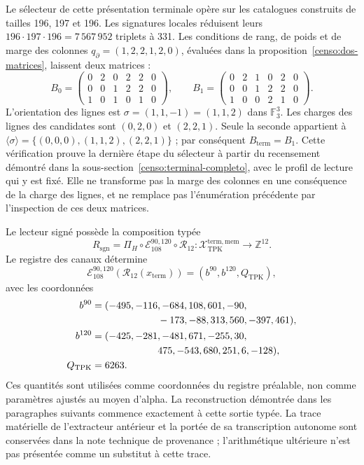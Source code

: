 Le sélecteur de cette présentation terminale opère sur les catalogues construits
de tailles 196, 197 et 196. Les signatures locales réduisent leurs
\(196\cdot197\cdot196=7\,567\,952\) triplets à 331. Les conditions de rang,
de poids et de marge des colonnes \(q_{\partial}=(1,2,2,1,2,0)\),
évaluées dans la proposition~\ref{censo:dos-matrices}, laissent deux matrices :
\[
 B_0=\begin{pmatrix}0&2&0&2&2&0\\0&0&1&2&2&0\\1&0&1&0&1&0\end{pmatrix},
 \qquad
 B_1=\begin{pmatrix}0&2&1&0&2&0\\0&0&1&2&2&0\\1&0&0&2&1&0\end{pmatrix}.
\]
L’orientation des lignes est \(\sigma=(1,1,-1)=(1,1,2)\) dans
\(\mathbb F_3^3\). Les charges des lignes des candidates sont
\((0,2,0)\) et \((2,2,1)\). Seule la seconde appartient à
\(\langle\sigma\rangle=\{(0,0,0),(1,1,2),(2,2,1)\}\) ; par conséquent
\(B_{\mathrm{term}}=B_1\). Cette vérification prouve la dernière étape du
sélecteur à partir du recensement démontré dans la
sous-section~\ref{censo:terminal-completo}, avec le profil de lecture qui y est fixé.
Elle ne transforme pas la marge des colonnes
en une conséquence de la charge des lignes, et ne remplace pas l’énumération
précédente par l’inspection de ces deux matrices.

Le lecteur signé possède la composition typée
\begin{equation}
 R_{\mathrm{sgn}}
 =\Pi_H\circ\mathcal E_{108}^{90,120}\circ\mathcal R_{12}:
 \mathcal X_{\mathrm{TPK}}^{\mathrm{term,mem}}
 \longrightarrow\mathbb Z^{12}.
 \label{eq:k-lector-firmado}
\end{equation}
Le registre des canaux détermine
\[
 \mathcal E_{108}^{90,120}(\mathcal R_{12}(x_{\mathrm{term}}))
 =(b^{90},b^{120},Q_{\mathrm{TPK}}),
\]
avec les coordonnées
\begin{align*}
 b^{90}={}&(-495,-116,-684,108,601,-90,\\
            &\hspace{19mm}-173,-88,313,560,-397,461),\\
 b^{120}={}&(-425,-281,-481,671,-255,30,\\
             &\hspace{19mm}475,-543,680,251,6,-128),\\
 Q_{\mathrm{TPK}}={}&6263.
\end{align*}
Ces quantités sont utilisées comme coordonnées du registre préalable, non
comme paramètres ajustés au moyen d’alpha. La reconstruction démontrée
dans les paragraphes suivants commence exactement à cette sortie typée.
La trace matérielle de l’extracteur antérieur et la portée de sa transcription
autonome sont conservées dans la note technique de provenance ; l’arithmétique
ultérieure n’est pas présentée comme un substitut à cette trace.

